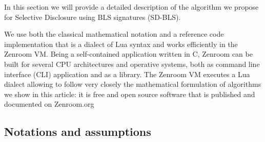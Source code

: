 \documentclass[conference]{IEEEtran}
\begin{document}
In this section we will provide a detailed description of the
algorithm we propose for Selective Disclosure using BLS signatures
(SD-BLS).

We use both the classical mathematical notation and a reference code
implementation that is a dialect of Lua syntax and works efficiently
in the Zenroom VM. Being a self-contained application written in C,
Zenroom can be built for several CPU architectures and operative
systems, both as command line interface (CLI) application and as a
library. The Zenroom VM executes a Lua dialect allowing to follow very
closely the mathematical formulation of algorithms we show in this
article: it is free and open source software that is published and
documented on Zenroom.org

\subsection{Notations and assumptions}
\end{document}
